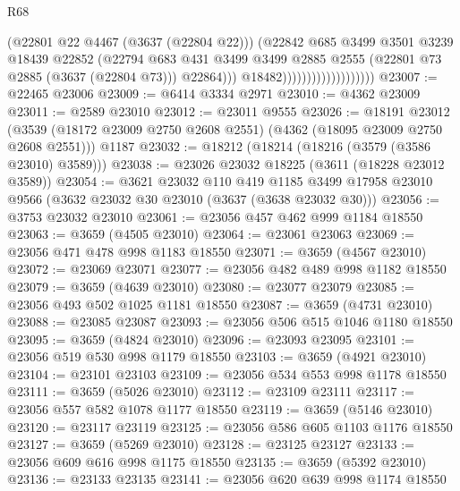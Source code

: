 \begin{lexlean}{R68}
\begin{coremodule}
                                            (@22801 @22 @4467 (@3637 (@22804 @22)))
                                            (@22842
                                              @685
                                              @3499
                                              @3501
                                              @3239
                                              @18439
                                              @22852
                                              (@22794
                                                @683
                                                @431
                                                @3499
                                                @3499
                                                @2885
                                                @2555
                                                (@22801 @73 @2885 (@3637 (@22804 @73)))
                                                @22864)))
                                          @18482)))))))))))))))))))
@23007 := @22465 @23006
@23009 := @6414 @3334 @2971
@23010 := @4362 @23009
@23011 := @2589 @23010
@23012 := @23011 @9555
@23026 := @18191
    @23012
    (@3539 (@18172 @23009 @2750 @2608 @2551) (@4362 (@18095 @23009 @2750 @2608 @2551)))
    @1187
@23032 := @18212 (@18214 (@18216 (@3579 (@3586 @23010) @3589)))
@23038 := @23026 @23032 @18225 (@3611 (@18228 @23012 @3589))
@23054 := @3621
    @23032
    @110
    @419
    @1185
    @3499
    @17958
    @23010
    @9566
    (@3632 @23032 @30 @23010 (@3637 (@3638 @23032 @30)))
@23056 := @3753 @23032 @23010
@23061 := @23056 @457 @462 @999 @1184 @18550
@23063 := @3659 (@4505 @23010)
@23064 := @23061 @23063
@23069 := @23056 @471 @478 @998 @1183 @18550
@23071 := @3659 (@4567 @23010)
@23072 := @23069 @23071
@23077 := @23056 @482 @489 @998 @1182 @18550
@23079 := @3659 (@4639 @23010)
@23080 := @23077 @23079
@23085 := @23056 @493 @502 @1025 @1181 @18550
@23087 := @3659 (@4731 @23010)
@23088 := @23085 @23087
@23093 := @23056 @506 @515 @1046 @1180 @18550
@23095 := @3659 (@4824 @23010)
@23096 := @23093 @23095
@23101 := @23056 @519 @530 @998 @1179 @18550
@23103 := @3659 (@4921 @23010)
@23104 := @23101 @23103
@23109 := @23056 @534 @553 @998 @1178 @18550
@23111 := @3659 (@5026 @23010)
@23112 := @23109 @23111
@23117 := @23056 @557 @582 @1078 @1177 @18550
@23119 := @3659 (@5146 @23010)
@23120 := @23117 @23119
@23125 := @23056 @586 @605 @1103 @1176 @18550
@23127 := @3659 (@5269 @23010)
@23128 := @23125 @23127
@23133 := @23056 @609 @616 @998 @1175 @18550
@23135 := @3659 (@5392 @23010)
@23136 := @23133 @23135
@23141 := @23056 @620 @639 @998 @1174 @18550

\end{coremodule}
\end{lexlean}
